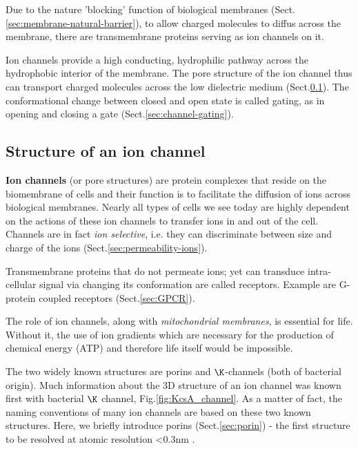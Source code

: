 Due to the nature 'blocking' function of biological membranes
(Sect.\ref{sec:membrane-natural-barrier}), to allow charged molecules to diffus
across the membrane, there are transmembrane proteins serving as ion channels on
it.

Ion channels provide a high conducting, hydrophilic pathway across the
hydrophobic interior of the membrane. The pore structure of the ion channel thus
can transport charged molecules across the low dielectric medium
(Sect.\ref{sec:structure}).
The conformational change between closed and open state is called gating, as in
opening and closing a gate (Sect.\ref{sec:channel-gating}).

\subsection{Structure of an ion channel}
\label{sec:structure}

{\bf Ion channels} (or pore structures) are protein complexes that
reside on the biomembrane of cells and their function is to facilitate
the diffusion of ions across biological membranes. Nearly all types of
cells we see today are highly dependent on the actions of these ion
channels to transfer ions in and out of the cell.
Channels are in fact {\it ion selective},
i.e. they can discriminate between size and charge of the ions
(Sect.\ref{sec:permeability-ions}).

\begin{mdframed}
Transmembrane proteins that do not permeate ions; yet can transduce
intra-cellular signal via changing its conformation are called receptors.
Example are G-protein coupled receptors (Sect.\ref{sec:GPCR}).
\end{mdframed}

The role of ion channels, along with {\it mitochondrial membranes}, is
essential for life. Without it, the use of ion gradients which are
necessary for the production of chemical energy (ATP) and therefore
life itself would be impossible.


The two widely known structures are porins and $\K$-channels (both of bacterial
origin).  Much information about the 3D structure of an ion channel was known first with
bacterial $\K$ channel, Fig.\ref{fig:KcsA_channel}. As a matter of fact, the
naming conventions of many ion channels are based on these two known structures. Here, we briefly
introduce porins (Sect.\ref{sec:porin}) - the first structure to be resolved at
atomic resolution <0.3nm \citep{cowan1992}.

